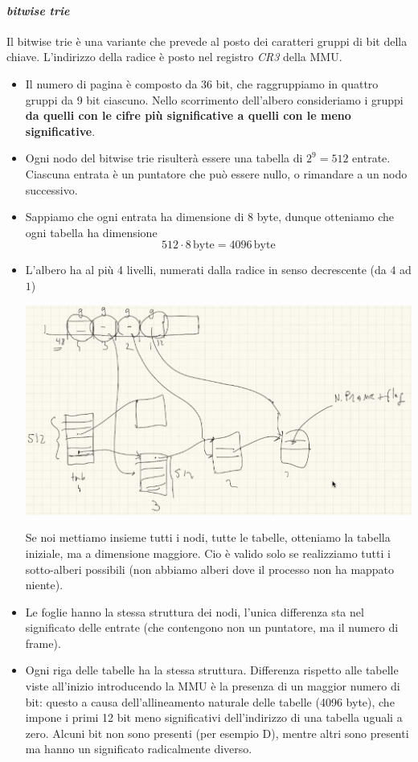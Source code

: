 \paragraph{\emph{bitwise trie}} Il bitwise trie è una variante che prevede al posto dei caratteri gruppi di bit della chiave. L'indirizzo della radice è posto nel registro \emph{CR3} della MMU.
\begin{itemize}
	\item Il numero di pagina è composto da 36 bit, che raggruppiamo in quattro gruppi da 9 bit ciascuno. Nello scorrimento dell'albero consideriamo i gruppi \textbf{da quelli con le cifre più significative a quelli con le meno significative}.
	\item Ogni nodo del bitwise trie risulterà essere una tabella di $2^9=512$ entrate. Ciascuna entrata è un puntatore che può essere nullo, o rimandare a un nodo successivo.
	\item Sappiamo che ogni entrata ha dimensione di 8 byte, dunque otteniamo che ogni tabella ha dimensione
	\[512 \cdot 8\,\text{byte}=4096\,\text{byte}\]
	\item L'albero ha al più 4 livelli, numerati dalla radice in senso decrescente (da $4$ ad $1$)
	\begin{center}
		\includegraphics[scale=.55]{img/216.PNG}
	\end{center}
	Se noi mettiamo insieme tutti i nodi, tutte le tabelle, otteniamo la tabella iniziale, ma a dimensione maggiore. Cio è valido solo se realizziamo tutti i sotto-alberi possibili (non abbiamo alberi dove il processo non ha mappato niente). 
	\item Le foglie hanno la stessa struttura dei nodi, l'unica differenza sta nel significato delle entrate (che contengono non un puntatore, ma il numero di frame). 
	\item Ogni riga delle tabelle ha la stessa struttura. Differenza rispetto alle tabelle viste all'inizio introducendo la MMU è la presenza di un maggior numero di bit: questo a causa dell'allineamento naturale delle tabelle (4096 byte), che impone i primi 12 bit meno significativi dell'indirizzo di una tabella uguali a zero. Alcuni bit non sono presenti (per esempio D), mentre altri sono presenti ma hanno un significato radicalmente diverso.

\end{itemize}

